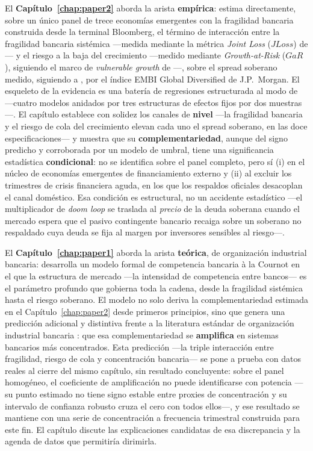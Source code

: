 El \textbf{Capítulo~\ref{chap:paper2}} aborda la arista \textbf{empírica}: estima directamente, sobre un único panel de trece economías emergentes con la fragilidad bancaria construida desde la terminal Bloomberg, el término de interacción entre la fragilidad bancaria sistémica —medida mediante la métrica \textit{Joint Loss} ($JLoss$) de \citet{Chari2024}— y el riesgo a la baja del crecimiento —medido mediante \textit{Growth-at-Risk} ($GaR$), siguiendo el marco de \textit{vulnerable growth} de \citet{ABG2019}—, sobre el spread soberano medido, siguiendo a \citet{Chari2024}, por el índice EMBI Global Diversified de J.P.\ Morgan. El esqueleto de la evidencia es una batería de regresiones estructurada al modo de \citet{Chari2024} —cuatro modelos anidados por tres estructuras de efectos fijos por dos muestras—. El capítulo establece con solidez los canales de \textbf{nivel} —la fragilidad bancaria y el riesgo de cola del crecimiento elevan cada uno el spread soberano, en las doce especificaciones— y muestra que su \textbf{complementariedad}, aunque del signo predicho y corroborada por un modelo de umbral, tiene una significancia estadística \textbf{condicional}: no se identifica sobre el panel completo, pero sí (i) en el núcleo de economías emergentes de financiamiento externo y (ii) al excluir los trimestres de crisis financiera aguda, en los que los respaldos oficiales desacoplan el canal doméstico. Esa condición es estructural, no un accidente estadístico —el multiplicador de \textit{doom loop} se traslada al \emph{precio} de la deuda soberana cuando el mercado espera que el pasivo contingente bancario recaiga sobre un soberano no respaldado cuya deuda se fija al margen por inversores sensibles al riesgo—.

El \textbf{Capítulo~\ref{chap:paper1}} aborda la arista \textbf{teórica}, de organización industrial bancaria: desarrolla un modelo formal de competencia bancaria à la Cournot en el que la estructura de mercado —la intensidad de competencia entre bancos— es el parámetro profundo que gobierna toda la cadena, desde la fragilidad sistémica hasta el riesgo soberano. El modelo no solo deriva la complementariedad estimada en el Capítulo~\ref{chap:paper2} desde primeros principios, sino que genera una predicción adicional y distintiva frente a la literatura estándar de organización industrial bancaria \citep{MMR2010}: que esa complementariedad se \textbf{amplifica} en sistemas bancarios más concentrados. Esta predicción —la triple interacción entre fragilidad, riesgo de cola y concentración bancaria— se pone a prueba con datos reales al cierre del mismo capítulo, sin resultado concluyente: sobre el panel homogéneo, el coeficiente de amplificación no puede identificarse con potencia —su punto estimado no tiene signo estable entre proxies de concentración y su intervalo de confianza robusto cruza el cero con todos ellos—, y ese resultado se mantiene con una serie de concentración a frecuencia trimestral construida para este fin. El capítulo discute las explicaciones candidatas de esa discrepancia y la agenda de datos que permitiría dirimirla.

